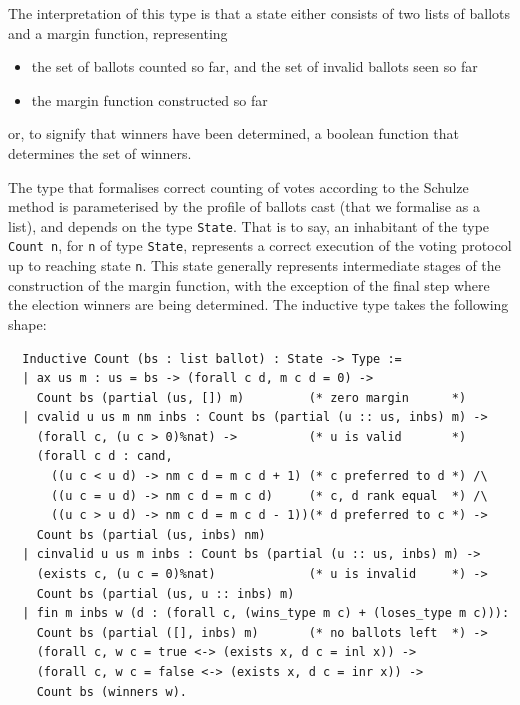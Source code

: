 \noindent
The interpretation of this type is that a state either consists of
two lists of ballots and a margin function, representing

\begin{itemize}
  \item the set of ballots counted so far, and the set of invalid
ballots seen so far
  \item the margin function constructed so far
\end{itemize}
or, to signify that winners have been determined, a boolean function
that determines the set of winners.

The type that formalises correct counting of votes according to the
Schulze method is parameterised by the profile of ballots cast (that
we formalise as a list), and depends on the type \texttt{State}. That
is to say, an inhabitant of the type \texttt{Count n}, for
\texttt{n} of type \texttt{State}, represents a correct execution of
the voting protocol up to reaching state \texttt{n}. This
state generally represents intermediate stages of the construction
of the margin function, with the exception of the final step where
the election winners are being determined. The inductive type takes
the following shape:

\begin{verbatim}
  Inductive Count (bs : list ballot) : State -> Type :=
  | ax us m : us = bs -> (forall c d, m c d = 0) -> 
    Count bs (partial (us, []) m)         (* zero margin      *)
  | cvalid u us m nm inbs : Count bs (partial (u :: us, inbs) m) -> 
    (forall c, (u c > 0)%nat) ->          (* u is valid       *)
    (forall c d : cand, 
      ((u c < u d) -> nm c d = m c d + 1) (* c preferred to d *) /\
      ((u c = u d) -> nm c d = m c d)     (* c, d rank equal  *) /\
      ((u c > u d) -> nm c d = m c d - 1))(* d preferred to c *) ->
    Count bs (partial (us, inbs) nm)
  | cinvalid u us m inbs : Count bs (partial (u :: us, inbs) m) -> 
    (exists c, (u c = 0)%nat)             (* u is invalid     *) ->
    Count bs (partial (us, u :: inbs) m)
  | fin m inbs w (d : (forall c, (wins_type m c) + (loses_type m c))):
    Count bs (partial ([], inbs) m)       (* no ballots left  *) ->
    (forall c, w c = true <-> (exists x, d c = inl x)) ->
    (forall c, w c = false <-> (exists x, d c = inr x)) ->
    Count bs (winners w).
 
\end{verbatim}


